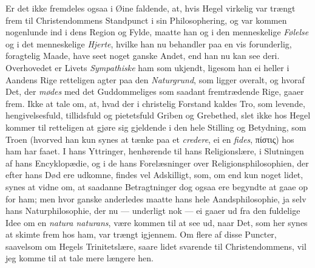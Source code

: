 \documentclass[12pt,a4paper]{book}
\begin{document}
Er det ikke fremdeles ogsaa i Øine faldende, at, hvis Hegel virkelig var
trængt frem til Christendommens Standpunct i sin Philosophering, og var
kommen nogenlunde ind i dens Region og Fylde, maatte han og i den
menneskelige \emph{Følelse} og i det menneskelige \emph{Hjerte}, hvilke han nu behandler
paa en vis forunderlig, foragtelig Maade, have seet noget ganske Andet, end
han nu kan see deri. Overhovedet er Livets \emph{Sympathiske} ham som ukjendt,
ligesom han ei heller i Aandens Rige retteligen agter paa den \emph{Naturgrund},
som ligger overalt, og hvoraf Det, der \emph{mødes} med det Guddommeliges som
saadant fremtrædende Rige, gaaer frem. Ikke at tale om, at, hvad der i
christelig Forstand kaldes Tro, som levende, hengivelsesfuld, tillidsfuld og
pietetsfuld Griben og Grebethed, slet ikke hos Hegel kommer til retteligen
at gjøre sig gjeldende i den hele Stilling og Betydning, som Troen (hvorved
han kun synes at tænke paa et \textit{credere}, ei en \textit{fides},
πίστις) hos ham har faaet. I hans Yttringer, henhørende til hans
Religionslære, i Slutningen af hans Encyklopædie, og i de hans
Forelæsninger over Religionsphilosophien, der efter hans Død ere udkomne,
findes vel Adskilligt, som, om end kun noget lidet, synes at vidne om, at
saadanne Betragtninger dog ogsaa ere begyndte at gaae op for ham; men hvor
ganske anderledes maatte hans hele Aandsphilosophie, ja selv hans
Naturphilosophie, der nu --- underligt nok --- ei gaaer ud fra den
fuldelige Idee om en \textit{natura naturans}, være kommen til at see ud,
naar Det, som her synes at skimte frem hos ham, var trængt igjennem. Om
flere af disse Puncter, saavelsom om Hegels Trinitetslære, saare lidet
svarende til Christendommens, vil jeg komme til at tale mere længere hen.
\end{document}
